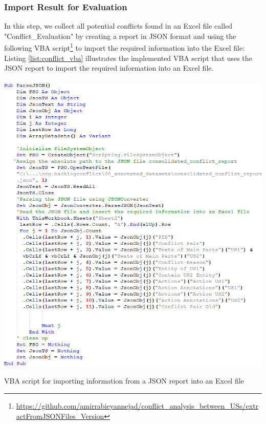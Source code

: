\subsubsection*{Import Result for Evaluation}
In this step, we collect all potential conflicts found in an Excel file called "Conflict\_Evaluation" by creating a report in JSON format and using the following VBA script\footnote{\href{https://github.com/amirrabieyannejad/conflict_analysis_between_USs/blob/main/00_annotated_datasets/extractFromJSONFiles_Version(new).xlsm}{https://github.com/amirrabieyannejad/conflict\_analysis\_between\_USs/extractFromJSONFiles\_Version}} to import the required information into the Excel file:
Listing \ref{list:conflict_vba} illustrates the implemented VBA script that uses the JSON report to import the required information into an Excel file.
\begin{MyListing}
	\paragraph{}
	\centering
	\includegraphics[scale=0.7]{Listing/conflict_vba.png}
	\caption{VBA script for importing information from a JSON report into an Excel file}\label{list:conflict_vba}
\end{MyListing}	
